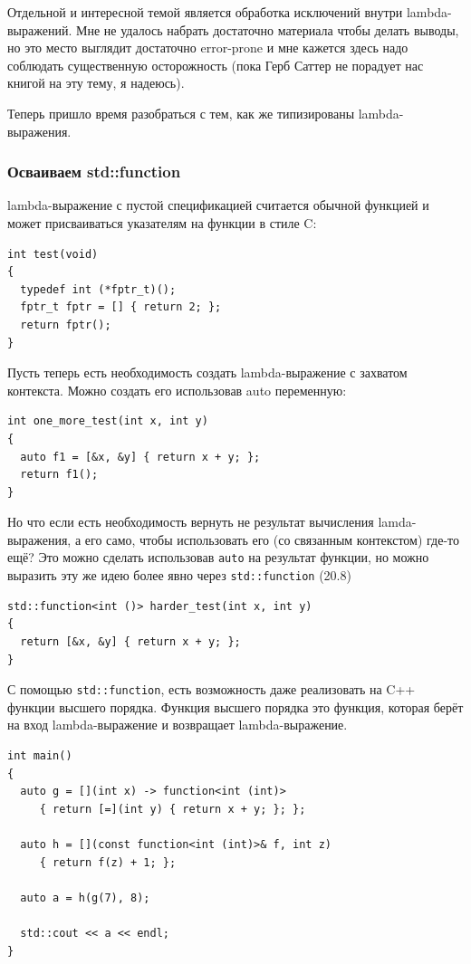 \documentclass[a4paper,12pt,oneside]{article}
\begin{document}
Отдельной и интересной темой является обработка исключений внутри lambda-выражений. Мне не удалось набрать достаточно материала чтобы делать выводы, но это место выглядит достаточно error-prone и мне кажется здесь надо соблюдать существенную осторожность (пока Герб Саттер не порадует нас книгой на эту тему, я надеюсь).

Теперь пришло время разобраться с тем, как же типизированы lambda-выражения.

\subsubsection{Осваиваем std::function}

lambda-выражение с пустой спецификацией считается обычной функцией и может присваиваться указателям на функции в стиле C:

\begin{lstlisting}
int test(void)
{
  typedef int (*fptr_t)();
  fptr_t fptr = [] { return 2; };
  return fptr();
}
\end{lstlisting}

Пусть теперь есть необходимость создать lambda-выражение с захватом контекста. Можно создать его использовав auto переменную:

\begin{lstlisting}
int one_more_test(int x, int y)
{
  auto f1 = [&x, &y] { return x + y; };
  return f1(); 
}
\end{lstlisting}

Но что если есть необходимость вернуть не результат вычисления lamda-выражения, а его само, чтобы использовать его (со связанным контекстом) где-то ещё? Это можно сделать использовав \lstinline!auto! на результат функции, но можно выразить эту же идею более явно через \lstinline!std::function! (20.8)
 
\begin{lstlisting}
std::function<int ()> harder_test(int x, int y)
{
  return [&x, &y] { return x + y; };
}
\end{lstlisting}

С помощью \lstinline!std::function!, есть возможность даже реализовать на C++ функции высшего порядка. Функция высшего порядка это функция, которая берёт на вход lambda-выражение и возвращает lambda-выражение.

\begin{lstlisting}
int main()
{
  auto g = [](int x) -> function<int (int)> 
     { return [=](int y) { return x + y; }; };

  auto h = [](const function<int (int)>& f, int z) 
     { return f(z) + 1; };

  auto a = h(g(7), 8);

  std::cout << a << endl;
}
\end{lstlisting}
\end{document}
